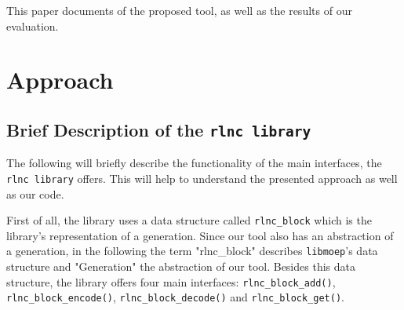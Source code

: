\documentclass[a4paper,english,10pt]{tumarticle}
\begin{document}
This paper documents of the proposed tool, as well as the results of our evaluation.

\section{Approach}\label{app}

\subsection{Brief Description of the \texttt{rlnc library}}\label{app:desc} The following will
briefly describe the functionality of the main interfaces, the \texttt{rlnc library} offers. This
will help to understand the presented approach as well as our code.

First of all, the library uses a data structure called \texttt{rlnc\_block} which is the library's
representation of a generation. Since our tool also has an abstraction of a generation, in the
following the term "rlnc\_block" describes \texttt{libmoep}'s data structure and "Generation" the
abstraction of our tool. Besides this data structure, the library offers four main interfaces:
\texttt{rlnc\_block\_add()}, \texttt{rlnc\_block\_encode()}, \texttt{rlnc\_block\_decode()} and
\texttt{rlnc\_block\_get()}.
\end{document}
